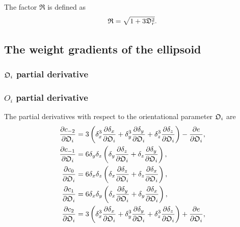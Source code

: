 \noindent The factor $\mathfrak{R}$ is defined as
\begin{equation} \label{eq: R}
 \mathfrak{R} = \sqrt{1 + 3\mathfrak{D}_r^2}.
\end{equation}




\subsection{The weight gradients of the ellipsoid}


\begin{latexonly}
    \subsubsection{$\mathfrak{O}_i$ partial derivative}
\end{latexonly}
\begin{htmlonly}
    \subsubsection{$O_i$ partial derivative}
\end{htmlonly}

The partial derivatives with respect to the orientational parameter $\mathfrak{O}_i$ are
\begin{subequations}
\begin{align}
    \frac{\partial c_{-2}}{\partial \mathfrak{O}_i} &= 3 \left( \delta_x^3 \frac{\partial \delta_x}{\partial \mathfrak{O}_i}  +  \delta_y^3 \frac{\partial \delta_y}{\partial \mathfrak{O}_i}  +  \delta_z^3 \frac{\partial \delta_z}{\partial \mathfrak{O}_i} \right) - \frac{\partial e}{\partial \mathfrak{O}_i}, \\
    \frac{\partial c_{-1}}{\partial \mathfrak{O}_i} &= 6 \delta_y \delta_z \left( \delta_y \frac{\partial \delta_z}{\partial \mathfrak{O}_i}  +  \delta_z \frac{\partial \delta_y}{\partial \mathfrak{O}_i} \right), \\
    \frac{\partial c_{0}}{\partial \mathfrak{O}_i}  &= 6 \delta_x \delta_z \left( \delta_x \frac{\partial \delta_z}{\partial \mathfrak{O}_i}  +  \delta_z \frac{\partial \delta_x}{\partial \mathfrak{O}_i} \right), \\
    \frac{\partial c_{1}}{\partial \mathfrak{O}_i}  &= 6 \delta_x \delta_y \left( \delta_x \frac{\partial \delta_y}{\partial \mathfrak{O}_i}  +  \delta_y \frac{\partial \delta_x}{\partial \mathfrak{O}_i} \right), \\
    \frac{\partial c_{2}}{\partial \mathfrak{O}_i}  &= 3 \left( \delta_x^3 \frac{\partial \delta_x}{\partial \mathfrak{O}_i}  +  \delta_y^3 \frac{\partial \delta_y}{\partial \mathfrak{O}_i}  +  \delta_z^3 \frac{\partial \delta_z}{\partial \mathfrak{O}_i} \right) + \frac{\partial e}{\partial \mathfrak{O}_i},
\end{align}
\end{subequations}

